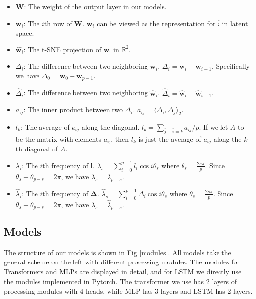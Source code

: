 \documentclass{article}
\begin{document}
\begin{itemize}
    \item $\bm W$: The weight of the output layer in our models.

    \item $\bm{w}_i$: The $i$th row of $\bm W$. $\bm{w}_i$ can be viewed as the representation for $\overline{i}$ in latent space.

    \item $\widehat{\bm{w}}_i$: The t-SNE projection of $\bm{w}_i$ in $\mathbb  {R}^2$.

    \item $\Delta_i$: The difference between two neighboring $\bm{w}_i$. $\Delta_i = \bm{w}_i - \bm{w}_{i-1}$. Specifically we have $\Delta_0 = \bm{w}_0 - \bm{w}_{p-1}$.

    \item $\widehat\Delta_i$: The difference between two neighboring $\widehat{\bm{w}}_i$. $\widehat\Delta_i = \widehat{\bm{w}}_i - \widehat{\bm{w}}_{i-1}$.

    \item $a_{ij}$: The inner product between two $\Delta_i$. $a_{ij} = \langle \Delta_i, \Delta_j\rangle_2$.

    \item $l_k$: The average of $a_{ij}$ along the diagonal. $l_k = \sum_{\overline{j}-\overline{i}=\overline{k}}a_{ij} /p$. If we let $A$ to be the matrix with elements $a_{ij}$, then $l_k$ is just the average of $a_{ij}$ along the $k$th diagonal of $A$.

    \item $\lambda_i$: The $i$th frequency of $\bm l$. $\lambda_s = \sum_{i=0}^{p-1} l_i\cos i\theta_s$ where $\theta_s = \frac{2s\pi}{p}$. Since $\theta_s + \theta_{p-s} = 2\pi$, we have $\lambda_{s} = \lambda_{p-s}$.
    
    \item $\widehat\lambda_i$: The $i$th frequency of $\bm\Delta$. $\widehat\lambda_s = \sum_{i=0}^{p-1} \Delta_i\cos i\theta_s$ where $\theta_s = \frac{2s\pi}{p}$. Since $\theta_s + \theta_{p-s} = 2\pi$, we have $\widehat\lambda_{s} = \widehat\lambda_{p-s}$.
\end{itemize}

\subsection{Models}
\label{appendix-model}

The structure of our models is shown in Fig \ref{modules}. All models take the general scheme on the left with different processing modules. The modules for Transformers and MLPs are displayed in detail, and for LSTM we directly use the modules implemented in Pytorch. The transformer we use has 2 layers of processing modules with 4 heads, while MLP has 3 layers and LSTM has 2 layers.
\end{document}
